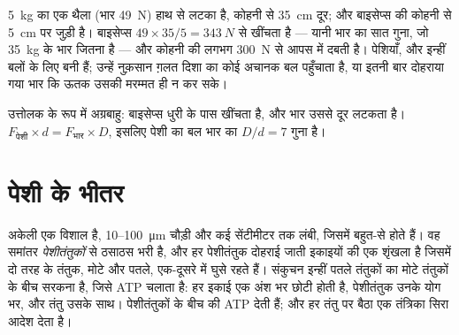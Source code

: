 \begin{example}[थैला थामना]\label{ex:g10:muscles-and-joints:bag}
\qty{5}{kg} का एक थैला (भार \qty{49}{N}) हाथ से लटका है, कोहनी से
\qty{35}{cm} दूर; और बाइसेप्स की  कोहनी से \qty{5}{cm} पर जुड़ी है।
बाइसेप्स $49 \times 35/5 = \qty{343}{N}$ से खींचता है --- यानी भार का
सात गुना, जो \qty{35}{kg} के भार जितना है --- और कोहनी की  लगभग
\qty{300}{N} से आपस में दबती है। पेशियाँ,  और  इन्हीं बलों
के लिए बनी हैं; उन्हें नुक़सान ग़लत दिशा का कोई अचानक बल पहुँचाता है, या
इतनी बार दोहराया गया भार कि ऊतक उसकी मरम्मत ही न कर सके।
\end{example}

\begin{omfigure}

{\small उत्तोलक के रूप में अग्रबाहु: बाइसेप्स धुरी के पास खींचता है, और
भार उससे दूर लटकता है। $F_{\text{पेशी}} \times d =
F_{\text{भार}} \times D$, इसलिए पेशी का बल भार का $D/d = 7$ गुना है।}
\end{omfigure}

\section{पेशी के भीतर}

\begin{proposition}[पेशी तंतु की बनावट]\label{prop:g10:muscles-and-joints:fibre}
 अकेली एक विशाल  है, \num{10}--\qty{100}{\micro m}
चौड़ी और कई सेंटीमीटर तक लंबी, जिसमें बहुत-से  होते हैं। वह समांतर
\emph{पेशीतंतुकों} से ठसाठस भरी है, और हर पेशीतंतुक दोहराई जाती इकाइयों
की एक शृंखला है जिसमें दो तरह के  तंतुक, मोटे और पतले, एक-दूसरे
में घुसे रहते हैं। संकुचन इन्हीं पतले तंतुकों का मोटे तंतुकों के बीच
सरकना है, जिसे ATP चलाता है: हर इकाई एक अंश भर छोटी होती है, पेशीतंतुक
उनके योग भर, और तंतु उसके साथ। पेशीतंतुकों के बीच की  ATP
देती हैं; और हर तंतु पर बैठा एक तंत्रिका सिरा आदेश देता है।
\end{proposition}
\admitted

